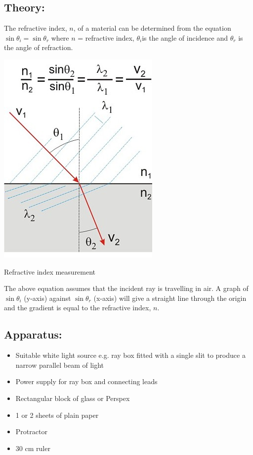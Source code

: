 \documentclass{tufte-handout}
\begin{document}
 \subsection{Theory:}  
The refractive index, $n$, of a material can be determined from the equation $\sin \theta_{i} = \sin \theta_{r}$ where $n$ = refractive index, $\theta_{i}$is the angle of incidence and $\theta_{r}$ is the angle of refraction. \begin{marginfigure}
\includegraphics[]{refrac.jpg}
\caption{Refractive index measurement}
\end{marginfigure} The above equation assumes that the incident ray is travelling in air.  A graph of $\sin\theta_{i}$ (y-axis) against $\sin \theta_{r}$ (x-axis) will give a straight line through the origin and the gradient is equal to the refractive index, $n$.  
\subsection{Apparatus:} 
\begin{itemize}
\item Suitable white light source e.g. ray box fitted with a single slit to produce a narrow parallel beam of light 
\item Power supply for ray box and connecting leads 
\item Rectangular block of glass or Perspex 
\item 1 or 2 sheets of plain paper 
\item Protractor 
\item 30 cm ruler
\end{itemize}
\end{document}
